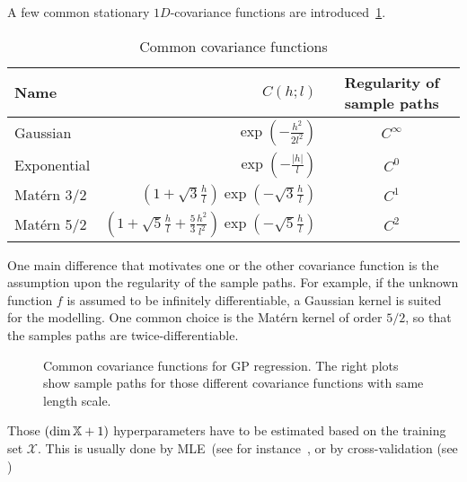\documentclass[../../Main_ManuscritThese.tex]{subfiles}
\newcommand\imgpath{/home/victor/acadwriting/Manuscrit/Text/Chapter4/img/}
\begin{document}
A few common stationary $1D$-covariance functions are introduced~\cref{tab:common_cov_fc}.

  \begin{table}[ht]
    \centering
    \begin{tabular}{lrc}
      \toprule
      Name & $C(h;l)$ & Regularity of sample paths\\ \midrule
      Gaussian & $\exp\left(- \frac{h^2}{2 l^2}\right)$ & $C^{\infty}$\\
      Exponential &$\exp\left(- \frac{\lvert h \rvert}{l}\right)$ & $C^0$  \\
      Matérn 3/2 & $\left(1 + \sqrt{3}\frac{h}{l}\right)\exp\left(-\sqrt{3}\frac{h}{l}\right)$ & $C^1$\\
      Matérn 5/2 & $\left(1+ \sqrt{5}\frac{h}{l} + \frac{5}{3}\frac{h^2}{l^2}\right) \exp\left(-\sqrt{5}\frac{h}{l}\right)$ & $C^2$\\ \bottomrule
    \end{tabular}
    \caption{\label{tab:common_cov_fc} Common covariance functions}
  \end{table}



  One main difference that motivates one or the other covariance function is the assumption upon the regularity of the sample paths. For example, if the unknown function $f$ is assumed to be infinitely differentiable, a Gaussian kernel is suited for the modelling. One common choice is the Matérn kernel of order $5/2$, so that the samples paths are twice-differentiable.

  
\begin{figure}[ht]
  \centering
  
  \caption{\label{fig:cov_fc_examples} Common covariance functions for GP regression. The right plots show sample paths for those different covariance functions with same length scale.}
\end{figure}

Those $(\dim \mathbb{X} + 1)$ hyperparameters have to be estimated based on the training set $\mathcal{X}$. This is usually done by MLE~(see for instance~\cite{ribaud_robustness_2019}, or by cross-validation (see \cite{ginsbourger_note_2009})
\end{document}
